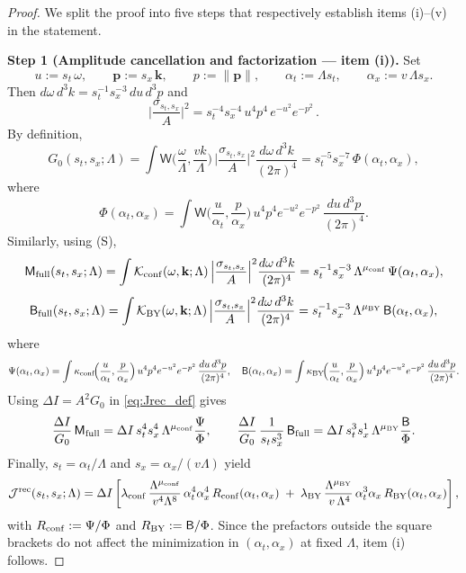 \documentclass[10pt]{article}
\theoremstyle{definition}
\theoremstyle{plain}
\begin{document}
\begin{proof}
We split the proof into five steps that respectively establish items (i)–(v) in the statement.

\medskip
\noindent\textbf{Step 1 (Amplitude cancellation and factorization — item (i)).}
Set
\[
u:=s_t\,\omega,\qquad \mathbf p:=s_x\,\mathbf k,\qquad p:=\|\mathbf p\|,\qquad
\alpha_t:=\Lambda s_t,\qquad \alpha_x:=v\,\Lambda s_x .
\]
Then $d\omega\,d^3k=s_t^{-1}s_x^{-3}\,du\,d^3p$ and
\[
\Big|\frac{\sigma_{s_t,s_x}}{A}\Big|^2
= s_t^{-4}s_x^{-4}\,u^4 p^4\,e^{-u^2}e^{-p^2}\,.
\]
By definition,
\[
G_0(s_t,s_x;\Lambda)
=\int \mathsf W\!\Big(\frac{\omega}{\Lambda},\frac{vk}{\Lambda}\Big)\,
\Big|\frac{\sigma_{s_t,s_x}}{A}\Big|^2\frac{d\omega\,d^3k}{(2\pi)^4}
=s_t^{-5}s_x^{-7}\,\Phi(\alpha_t,\alpha_x),
\]
where
\[
\Phi(\alpha_t,\alpha_x)=\int \mathsf W\!\Big(\frac{u}{\alpha_t},\frac{p}{\alpha_x}\Big)\,
u^4 p^4 e^{-u^2} e^{-p^2}\,\frac{du\,d^3p}{(2\pi)^4}.
\]
Similarly, using (S),
\[
\mathsf M_{\rm full}(s_t,s_x;\Lambda)
=\int \mathcal K_{\rm conf}(\omega,\mathbf k;\Lambda)\,\Big|\frac{\sigma_{s_t,s_x}}{A}\Big|^2\frac{d\omega\,d^3k}{(2\pi)^4}
=s_t^{-1}s_x^{-3}\,\Lambda^{\mu_{\rm conf}}\,\Psi(\alpha_t,\alpha_x),
\]
\[
\mathsf B_{\rm full}(s_t,s_x;\Lambda)
=\int \mathcal K_{\rm BY}(\omega,\mathbf k;\Lambda)\,\Big|\frac{\sigma_{s_t,s_x}}{A}\Big|^2\frac{d\omega\,d^3k}{(2\pi)^4}
=s_t^{-1}s_x^{-3}\,\Lambda^{\mu_{\rm BY}}\,\mathsf B(\alpha_t,\alpha_x),
\]
where
\[
\Psi(\alpha_t,\alpha_x)
=\int \kappa_{\rm conf}\!\Big(\frac{u}{\alpha_t},\frac{p}{\alpha_x}\Big)\,
u^4 p^4 e^{-u^2} e^{-p^2}\,\frac{du\,d^3p}{(2\pi)^4},
\quad
\mathsf B(\alpha_t,\alpha_x)
=\int \kappa_{\rm BY}\!\Big(\frac{u}{\alpha_t},\frac{p}{\alpha_x}\Big)\,
u^4 p^4 e^{-u^2} e^{-p^2}\,\frac{du\,d^3p}{(2\pi)^4}.
\]
Using $\Delta I=A^2 G_0$ in \eqref{eq:Jrec_def} gives
\[
\frac{\Delta I}{G_0}\,\mathsf M_{\rm full}
=\Delta I\,s_t^{4}s_x^{4}\,\Lambda^{\mu_{\rm conf}}\frac{\Psi}{\Phi},\qquad
\frac{\Delta I}{G_0}\,\frac{1}{s_t s_x^3}\,\mathsf B_{\rm full}
=\Delta I\,s_t^{3}s_x^{1}\,\Lambda^{\mu_{\rm BY}}\frac{\mathsf B}{\Phi}.
\]
Finally, $s_t=\alpha_t/\Lambda$ and $s_x=\alpha_x/(v\Lambda)$ yield
\[
\mathcal J^{\rm rec}(s_t,s_x;\Lambda)
=\Delta I\left[
\lambda_{\rm conf}\,\frac{\Lambda^{\mu_{\rm conf}}}{v^{4}\Lambda^{8}}\,
\alpha_t^{4}\alpha_x^{4}\,R_{\rm conf}(\alpha_t,\alpha_x)
\;+\;
\lambda_{\rm BY}\,\frac{\Lambda^{\mu_{\rm BY}}}{\,v\,\Lambda^{4}}\,
\alpha_t^{3}\alpha_x\,R_{\rm BY}(\alpha_t,\alpha_x)
\right],
\]
with $R_{\rm conf}:=\Psi/\Phi$ and $R_{\rm BY}:=\mathsf B/\Phi$. Since the prefactors outside the square brackets do not affect the minimization in $(\alpha_t,\alpha_x)$ at fixed $\Lambda$, item (i) follows.


\end{proof}
\end{document}
